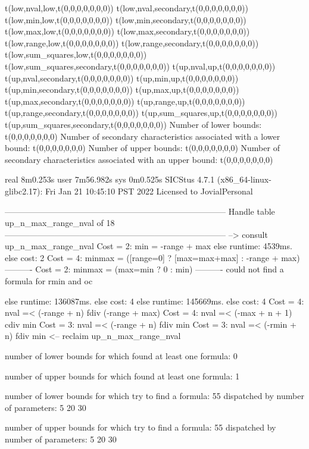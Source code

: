 t(low,nval,low,t(0,0,0,0,0,0,0))
t(low,nval,secondary,t(0,0,0,0,0,0,0))
t(low,min,low,t(0,0,0,0,0,0,0))
t(low,min,secondary,t(0,0,0,0,0,0,0))
t(low,max,low,t(0,0,0,0,0,0,0))
t(low,max,secondary,t(0,0,0,0,0,0,0))
t(low,range,low,t(0,0,0,0,0,0,0))
t(low,range,secondary,t(0,0,0,0,0,0,0))
t(low,sum_squares,low,t(0,0,0,0,0,0,0))
t(low,sum_squares,secondary,t(0,0,0,0,0,0,0))
t(up,nval,up,t(0,0,0,0,0,0,0))
t(up,nval,secondary,t(0,0,0,0,0,0,0))
t(up,min,up,t(0,0,0,0,0,0,0))
t(up,min,secondary,t(0,0,0,0,0,0,0))
t(up,max,up,t(0,0,0,0,0,0,0))
t(up,max,secondary,t(0,0,0,0,0,0,0))
t(up,range,up,t(0,0,0,0,0,0,0))
t(up,range,secondary,t(0,0,0,0,0,0,0))
t(up,sum_squares,up,t(0,0,0,0,0,0,0))
t(up,sum_squares,secondary,t(0,0,0,0,0,0,0))
Number of lower bounds:                                             t(0,0,0,0,0,0,0)
Number of secondary characteristics associated with a lower bound:  t(0,0,0,0,0,0,0)
Number of upper bounds:                                             t(0,0,0,0,0,0,0)
Number of secondary characteristics associated with an upper bound: t(0,0,0,0,0,0,0)

real	8m0.253s
user	7m56.982s
sys	0m0.525s
SICStus 4.7.1 (x86_64-linux-glibc2.17): Fri Jan 21 10:45:10 PST 2022
Licensed to JovialPersonal


--------------------------------------------------------------------------------
Handle table up_n_max_range_nval of 18
--------------------------------------------------------------------------------
--> consult up_n_max_range_nval
Cost =  2:  min    = -range + max
else runtime: 4539ms. else cost: 2
Cost =  4:  minmax = ([range=0] ? [max=max+max] : -range + max) %
----------
Cost =  2:  minmax = (max=min ? 0 : min)
----------
could not find a formula for rmin and oc

else runtime: 136087ms. else cost: 4
else runtime: 145669ms. else cost: 4
Cost =  4:  nval =< (-range + n) fdiv (-range + max) %
Cost =  4:  nval =< (-max + n + 1) cdiv min %
Cost =  3:  nval =< (-range + n) fdiv min
Cost =  3:  nval =< (-rmin + n) fdiv min %
<-- reclaim up_n_max_range_nval

number of lower bounds for which found at least one formula: 0

number of upper bounds for which found at least one formula: 1

number of lower bounds for which try to find a formula: 55
dispatched by number of parameters: 5  20  30

number of upper bounds for which try to find a formula: 55
dispatched by number of parameters: 5  20  30

